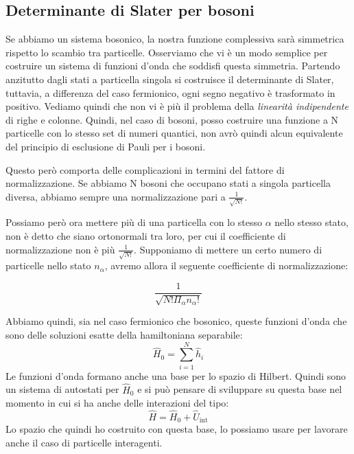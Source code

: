 \subsection{Determinante di Slater per bosoni}
Se abbiamo un sistema bosonico, la nostra funzione complessiva sarà simmetrica rispetto lo scambio tra particelle. Osserviamo che vi è un modo semplice per costruire un sistema di funzioni d'onda che soddisfi questa simmetria. Partendo anzitutto dagli stati a particella singola si costruisce il determinante di Slater, tuttavia, a differenza del caso fermionico, ogni segno negativo è trasformato in positivo. Vediamo quindi che non vi è più il problema della \textit{linearità indipendente} di righe e colonne. Quindi, nel caso di bosoni, posso costruire una funzione a N particelle con lo stesso set di numeri quantici, non avrò quindi alcun equivalente del principio di esclusione di Pauli per i bosoni.

Questo però comporta delle complicazioni in termini del fattore di normalizzazione. Se abbiamo N bosoni che occupano stati a singola particella diversa, abbiamo sempre una normalizzazione pari a $\frac{1}{\sqrt{N!}}$.

Possiamo però ora mettere più di una particella con lo stesso $\alpha$ nello stesso stato, non è detto che siano ortonormali tra loro, per cui il coefficiente di normalizzazione non è più $\frac{1}{\sqrt{N!}}$. Supponiamo di mettere un certo numero di particelle nello stato $n_\alpha$, avremo allora il seguente coefficiente di normalizzazione:

\begin{equation*}
    \frac{1}{\sqrt{N!\Pi_\alpha n_\alpha!}}
\end{equation*}

Abbiamo quindi, sia nel caso fermionico che bosonico, queste funzioni d'onda che sono delle soluzioni esatte della hamiltoniana separabile:
\begin{equation*}
    \hat H_0 = \sum_{i=1}^N \hat h_i
\end{equation*}
Le funzioni d'onda formano anche una base per lo spazio di Hilbert. Quindi sono un sistema di autostati per $\hat H_0$ e si può pensare di sviluppare su questa base nel momento in cui si ha anche delle interazioni del tipo:
\begin{equation*}
    \hat H = \hat H_0 + \hat U_{\text{int}}
\end{equation*}
Lo spazio che quindi ho costruito con questa base, lo possiamo usare per lavorare anche il caso di particelle interagenti. \\


